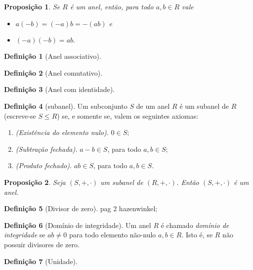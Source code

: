 \documentclass[a4paper,12pt]{report}
\theoremstyle{plain}
\newtheorem{proposicao}{Proposição}[section]
\theoremstyle{definition}
\newtheorem{definicao}{Definição}[section]
\begin{document}
\begin{proposicao}
	Se $R$ é um anel, então, para todo $a,b\in R$ vale
	\begin{itemize}
		\item $a(-b) = (-a)b = -(ab)$ e
		\item $(-a)(-b) = ab.$
	\end{itemize}
\end{proposicao}

\begin{definicao}[Anel associativo]
	
\end{definicao}

\begin{definicao}[Anel comutativo]
	
\end{definicao}

\begin{definicao}[Anel com identidade]
	
\end{definicao}

\begin{definicao}[subanel]
	Um subconjunto $S$ de um anel $R$ é um subanel de $R$ (escreve-se $S\leq R$) se, e somente se, valem os seguintes axiomas:
	\begin{enumerate}
		\item \emph{(Existência do elemento nulo).} $0 \in S$;
		\item \emph{(Subtração fechada).} $a-b \in S$, para todo $a,b\in S$;
		\item \emph{(Produto fechado).} $ab\in S$, para todo $a,b\in S$.
	\end{enumerate}
\end{definicao}

\begin{proposicao}
	Seja $(S,+, \cdot)$ um subanel de $(R,+, \cdot)$. Então $(S,+, \cdot)$ é um anel.	
\end{proposicao}

\begin{definicao}[Divisor de zero]
	pag 2 hazenwinkel;
\end{definicao}

\begin{definicao}[Domínio de integridade]
	Um anel $R$ é chamado \emph{domínio de integridade} se $ab \neq 0$ para todo elemento não-nulo $a,b \in R$. Isto é, se $R$ não possuir divisores de zero.
\end{definicao}

\begin{definicao}[Unidade]
	
\end{definicao}
\end{document}

